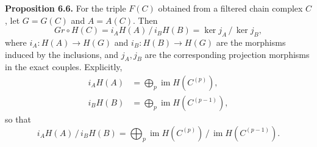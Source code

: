 \textbf{Proposition 6.6.} For the triple $F(C)$ obtained from a filtered chain complex $C$, let $G = G(C)$ and $A = A(C)$. Then
$$Gr \circ H(C) = i_A H(A) \,/\, i_B H(B) = \ker j_A \,/\, \ker j_B,$$
where $i_A : H(A) \to H(G)$ and $i_B : H(B) \to H(G)$ are the morphisms induced by the inclusions, and $j_A, j_B$ are the corresponding projection morphisms in the exact couples. Explicitly,
\begin{align*}
i_A H(A) &= \bigoplus_p \operatorname{im} H(C^{(p)}), \\
i_B H(B) &= \bigoplus_p \operatorname{im} H(C^{(p-1)}),
\end{align*}
so that
$$i_A H(A) \,/\, i_B H(B) = \bigoplus_p \operatorname{im} H(C^{(p)}) \,/\, \operatorname{im} H(C^{(p-1)}).$$
